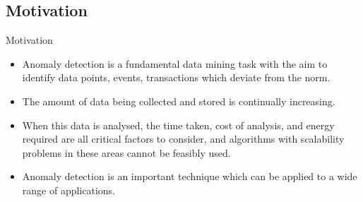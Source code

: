 \subsection{Motivation}
\begin{frame}[label=motivation]{Motivation}

    \begin{itemize}[<+->]
        \item Anomaly detection is a fundamental data mining task with the aim
            to identify data points, events, transactions which deviate from the
            norm.

        \medskip
        \item The amount of data being collected and stored is continually
            increasing.

        \medskip
        \item When this data is analysed, the time taken, cost of analysis, and
            energy required are all critical factors to consider, and algorithms
            with scalability problems in these areas cannot be feasibly used.

        \medskip
        \item Anomaly detection is an important technique which can be
            applied to a wide range of applications.
    \end{itemize}
\end{frame}

